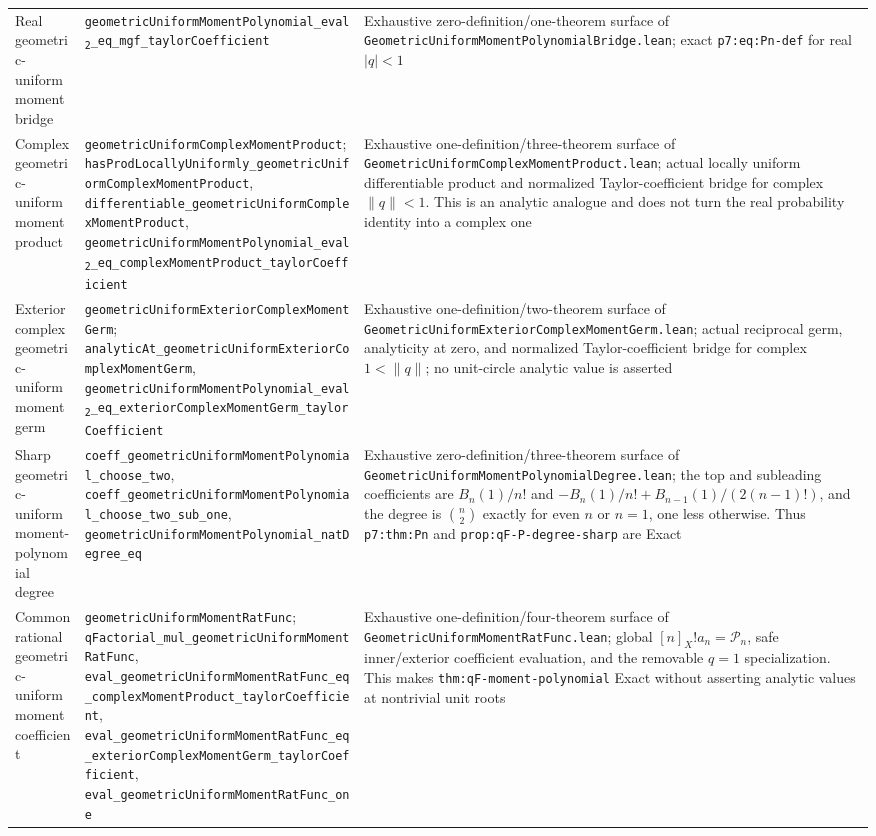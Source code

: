 \documentclass[11pt,oneside]{article}
\theoremstyle{definition}
\theoremstyle{remark}
\begin{document}
\begin{longtable}{@{}>{\raggedright\arraybackslash}p{} >{\raggedright\arraybackslash}p{} >{\raggedright\arraybackslash}p{}@{}}
Real geometric-uniform moment bridge & \nolinkurl{geometricUniformMomentPolynomial_eval}\texttt{\textsubscript{2}}\nolinkurl{_eq_mgf_taylorCoefficient} & Exhaustive zero-definition/one-theorem surface of \nolinkurl{GeometricUniformMomentPolynomialBridge.lean}; exact \nolinkurl{p7:eq:Pn-def} for real \(\lvert q\rvert<1\) \\
Complex geometric-uniform moment product & \nolinkurl{geometricUniformComplexMomentProduct}; \nolinkurl{hasProdLocallyUniformly_geometricUniformComplexMomentProduct}, \nolinkurl{differentiable_geometricUniformComplexMomentProduct}, \nolinkurl{geometricUniformMomentPolynomial_eval}\texttt{\textsubscript{2}}\nolinkurl{_eq_complexMomentProduct_taylorCoefficient} & Exhaustive one-definition/three-theorem surface of \nolinkurl{GeometricUniformComplexMomentProduct.lean}; actual locally uniform differentiable product and normalized Taylor-coefficient bridge for complex \(\lVert q\rVert<1\).  This is an analytic analogue and does not turn the real probability identity into a complex one \\
Exterior complex geometric-uniform moment germ & \nolinkurl{geometricUniformExteriorComplexMomentGerm}; \nolinkurl{analyticAt_geometricUniformExteriorComplexMomentGerm}, \nolinkurl{geometricUniformMomentPolynomial_eval}\texttt{\textsubscript{2}}\nolinkurl{_eq_exteriorComplexMomentGerm_taylorCoefficient} & Exhaustive one-definition/two-theorem surface of \nolinkurl{GeometricUniformExteriorComplexMomentGerm.lean}; actual reciprocal germ, analyticity at zero, and normalized Taylor-coefficient bridge for complex \(1<\lVert q\rVert\); no unit-circle analytic value is asserted \\
Sharp geometric-uniform moment-polynomial degree & \nolinkurl{coeff_geometricUniformMomentPolynomial_choose_two}, \nolinkurl{coeff_geometricUniformMomentPolynomial_choose_two_sub_one}, \nolinkurl{geometricUniformMomentPolynomial_natDegree_eq} & Exhaustive zero-definition/three-theorem surface of \nolinkurl{GeometricUniformMomentPolynomialDegree.lean}; the top and subleading coefficients are \(B_n(1)/n!\) and \(-B_n(1)/n!+B_{n-1}(1)/(2(n-1)!)\), and the degree is \(\binom n2\) exactly for even \(n\) or \(n=1\), one less otherwise.  Thus \nolinkurl{p7:thm:Pn} and \nolinkurl{prop:qF-P-degree-sharp} are Exact \\
Common rational geometric-uniform moment coefficient & \nolinkurl{geometricUniformMomentRatFunc}; \nolinkurl{qFactorial_mul_geometricUniformMomentRatFunc}, \nolinkurl{eval_geometricUniformMomentRatFunc_eq_complexMomentProduct_taylorCoefficient}, \nolinkurl{eval_geometricUniformMomentRatFunc_eq_exteriorComplexMomentGerm_taylorCoefficient}, \nolinkurl{eval_geometricUniformMomentRatFunc_one} & Exhaustive one-definition/four-theorem surface of \nolinkurl{GeometricUniformMomentRatFunc.lean}; global \([n]_X!a_n=\mathcal P_n\), safe inner/exterior coefficient evaluation, and the removable \(q=1\) specialization.  This makes \nolinkurl{thm:qF-moment-polynomial} Exact without asserting analytic values at nontrivial unit roots \\

\end{longtable}
\end{document}
